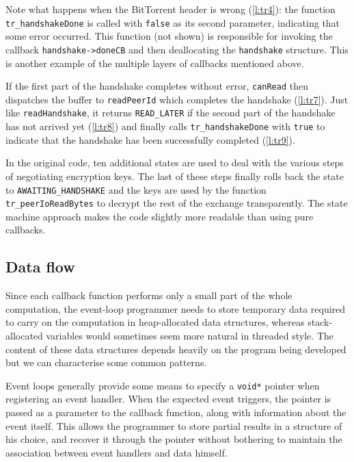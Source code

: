 \documentclass[a4paper]{llncs}
\begin{document}
Note what happens when the BitTorrent header is wrong (\cref{l:tr4}): the function
\texttt{tr\_hand\-shake\-Done} is called with \texttt{false} as its second parameter,
indicating that some error occurred.  This function (not shown) is responsible
for invoking the callback \texttt{hand\-shake\-->\-doneCB} and then deallocating the
\texttt{handshake} structure.  This is another example of the multiple layers of
callbacks mentioned above.

If the first part of the handshake completes without error, \texttt{canRead}
then dispatches the buffer to \texttt{readPeerId} which completes the handshake
(\cref{l:tr7}).  Just like \texttt{readHandshake}, it returns \texttt{READ\_LATER} if the
second part of the handshake has not arrived yet (\cref{l:tr8}) and finally calls
\texttt{tr\_handshakeDone} with \texttt{true} to indicate that the handshake has
been successfully completed (\cref{l:tr9}).

In the original code, ten additional states are used to deal with the various
steps of negotiating encryption keys.  The last of these steps finally rolls
back the state to \texttt{AWAITING\_HANDSHAKE} and the keys are used by the
function \texttt{tr\_peerIoReadBytes} to decrypt the rest of the exchange
transparently.  The state machine approach makes the code slightly more
readable than using pure callbacks.

\subsection{Data flow}
\label{sec:data-flow}

Since each callback function performs only a small part of the whole
computation, the event-loop programmer needs to store temporary data
required to carry on the computation in heap-allocated data structures,
whereas stack-allocated variables would sometimes seem more natural in
threaded style.  The content of these data structures depends heavily on the
program being developed but we can characterise some common patterns.

Event loops generally provide some means to specify a \texttt{void*} pointer
when registering an event handler.  When the expected event triggers, the
pointer is passed as a parameter to the callback function, along with
information about the event itself.  This allows the programmer to store
partial results in a structure of his choice, and recover it through the
pointer without bothering to maintain the association between event handlers
and data himself.
\end{document}
